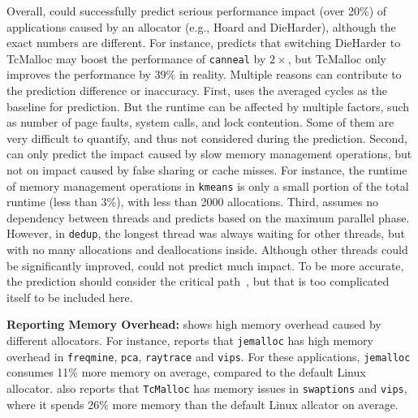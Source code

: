 Overall, \MP{} could successfully predict serious performance impact (over 20\%) of  applications caused by an allocator (e.g., Hoard and DieHarder), although the exact numbers are different. For instance, \MP{} predicts that switching DieHarder to TcMalloc may boost the performance of \texttt{canneal} by $2\times$, but TcMalloc only improves the performance by 39\% in reality. Multiple reasons can contribute to the prediction difference or inaccuracy. First, \MP{} uses the averaged cycles as the baseline for prediction. But the runtime can be affected by multiple factors, such as number of page faults, system calls, and lock contention. Some of them are very difficult to quantify, and thus not considered during the prediction. Second, \MP{} can only predict the impact caused by slow memory management operations, but not on impact caused by false sharing or cache misses. For instance, the runtime of memory management operations in \texttt{kmeans} is only a small portion of the total runtime (less than 3\%), with less than 2000 allocations. Third, \MP{} assumes no dependency between threads and predicts  based on the maximum parallel phase. However, in \texttt{dedup}, the longest thread was always waiting for other threads, but with no many allocations and deallocations inside. Although other threads could be significantly improved, \MP{} could not predict much impact. To be more accurate, the prediction should consider the critical path~\cite{wPerf}, but that is too complicated itself to be included here.

\textbf{Reporting Memory Overhead:} 
\MP{} shows high memory overhead caused by  different allocators. For instance, \MP{} reports that \texttt{jemalloc} has high memory overhead in \texttt{freqmine}, \texttt{pca}, \texttt{raytrace} and \texttt{vips}. For these applications, \texttt{jemalloc} consumes 11\% more memory on average, compared to the default Linux allocator. \MP{} also reports that \texttt{TcMalloc} has memory issues in \texttt{swaptions} and \texttt{vips}, where it spends 26\% more memory than the default Linux allcator on average. 



